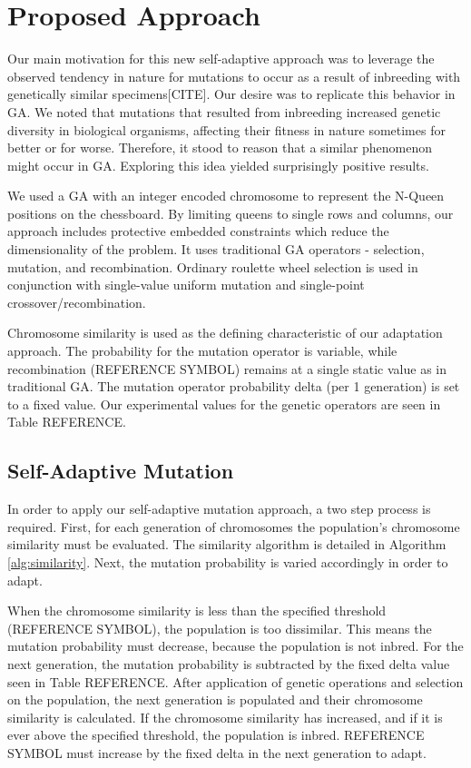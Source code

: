\documentclass[conference]{IEEEtran}
\begin{document}
\section{Proposed Approach}\label{params}
Our main motivation for this new self-adaptive approach was to leverage the observed tendency in nature for mutations to occur as a result of inbreeding with genetically similar specimens[CITE]. Our desire was to replicate this behavior in GA. We noted that mutations that resulted from inbreeding increased genetic diversity in biological organisms, affecting their fitness in nature sometimes for better or for worse. Therefore, it stood to reason that a similar phenomenon might occur in GA. Exploring this idea yielded surprisingly positive results.

We used a GA with an integer encoded chromosome to represent the N-Queen positions on the chessboard. By limiting queens to single rows and columns, our approach includes protective embedded constraints which reduce the dimensionality of the problem. It uses traditional GA operators - selection, mutation, and recombination. Ordinary roulette wheel selection is used in conjunction with single-value uniform mutation and single-point crossover/recombination. 

Chromosome similarity is used as the defining characteristic of our adaptation approach. The probability for the mutation operator is variable, while recombination ({REFERENCE SYMBOL}) remains at a single static value as in traditional GA. The mutation operator probability delta (per 1 generation) is set to a fixed value. Our experimental values for the genetic operators are seen in Table {REFERENCE}.


\subsection{Self-Adaptive Mutation}
In order to apply our self-adaptive mutation approach, a two step process is required. First, for each generation of chromosomes the population's chromosome similarity must be evaluated. The similarity algorithm is detailed in Algorithm \ref{alg:similarity}. Next, the mutation probability is varied accordingly in order to adapt.  

When the chromosome similarity is less than the specified threshold ({REFERENCE SYMBOL}), the population is too dissimilar. This means the mutation probability must decrease, because the population is not inbred. For the next generation, the mutation probability is subtracted by the fixed delta value seen in Table {REFERENCE}. After application of genetic operations and selection on the population, the next generation is populated and their chromosome similarity is calculated. If the chromosome similarity has increased, and if it is ever above the specified threshold, the population is inbred. {REFERENCE SYMBOL} must increase by the fixed delta in the next generation to adapt.
\end{document}
